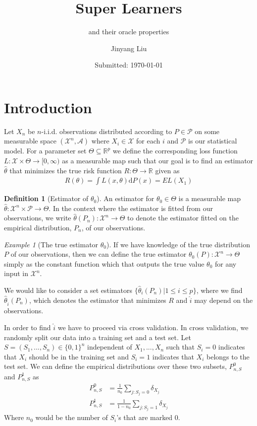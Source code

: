 \documentclass[11pt, a4paper]{article}
\author{Jinyang Liu}
\title{Super Learners}
\subtitle{and their oracle properties}
\date{Submitted: \today}
\theoremstyle{definition}
\newtheorem{definition}[theorem]{Definition}
\theoremstyle{remark}
\newtheorem{example}{Example}
\begin{document}
\begingroup
    \selectfont
    \maketitle
    \tableofcontents
    \newpage
\endgroup


\section{Introduction}
Let $ X_n $ be $ n $-i.i.d. observations distributed according to $ P \in \mathcal{P} $ on some measurable space $ (\mathcal{X}^{n}, \mathcal{A}) $ where $ X_{i} \in \mathcal{X} $ for each $ i $ and $ \mathcal{P} $ is our statistical model. For a parameter set $ \Theta \subseteq \mathbb{R}^{p}$ we define the corresponding loss function $ L : \mathcal{X} \times \Theta \to [0, \infty) $ as a measurable map such that our goal is to find an estimator $ \hat{\theta}  $ that minimizes the true risk function $ R: \Theta \to \mathbb{R} $ given as
\begin{align*}
    R(\theta) = \int L(x, \theta)  \mathrm{d}P(x) = EL(X_1) 
\end{align*}
\begin{definition}[Estimator of $ \theta_0 $]
    An estimator for $ \theta_0 \in \Theta $ is a measurable map $ \hat{\theta} : \mathcal{X}^{n} \times \mathcal{P} \to \Theta  $. In the context where the estimator is fitted from our observations, we write $ \hat{\theta}(P_n) : \mathcal{X}^{n} \to \Theta $ to denote the estimator fitted on the empirical distribution, $ P_n $, of our observations. 
\end{definition}

\begin{example}[The true estimator $ \theta_0 $]
    If we have knowledge of the true distribution $ P $ of our observations, then we can define the true estimator $ \theta_0(P) : \mathcal{X}^{n} \to \Theta $ simply as the constant function which that outputs the true value $ \theta_0 $ for any input in $ \mathcal{X}^{n} $.
\end{example}


We would like to consider a set estimators $ \{ \hat{\theta}_{i}(P_n) | 1 \leq i \leq p \} $, where we find $ \hat{\theta}_{ \hat{i} }(P_n) $, which denotes the estimator that minimizes $ R $ and $ \hat{i}  $ may depend on the observations. 

In order to find $ \hat{i}  $ we have to proceed via cross validation. In cross validation, we randomly split our data into a training set and a test set. Let $ S = (S_1,...,S_n) \in \{0,1\}^{n} $ independent of $ X_1,..., X_n $ such that $ S_i = 0 $ indicates that $ X_i $ should be in the training set and $ S_i = 1 $ indicates that $ X_i $ belongs to the test set. We can define the empirical distributions over these two subsets, $ P_{n,S}^0$ and $ P_{n,S}^{1} $ as
\begin{align*}
    P_{n,S}^{0} &= \frac{1}{n_0} \sum_{j: S_j = 0} \delta_{X_j} \\
    P_{n,S}^{1} &= \frac{1}{1-n_0} \sum_{j: S_j = 1} \delta_{X_j} 
\end{align*}
Where $ n_0 $ would be the number of $ S_i $'s that are marked $ 0 $. 
\end{document}
